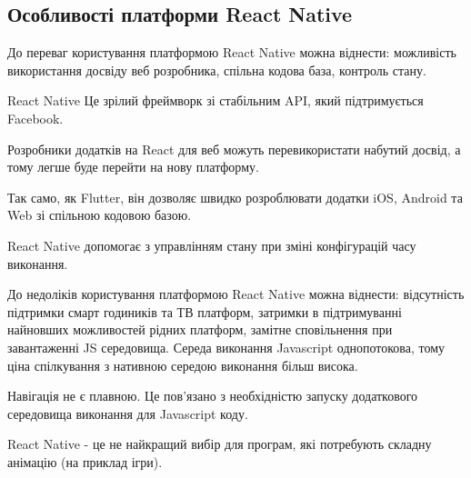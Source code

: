 \subsection{Особливості платформи React Native}
\label{subsec:rn_pros_cons}

До переваг користування платформою React Native можна віднести:
можливість використання досвіду веб розробника,
спільна кодова база,
контроль стану.

React Native Це зрілий фреймворк зі стабільним API, який підтримується Facebook.

Розробники додатків на React для веб можуть перевикористати набутий досвід, а тому легше буде перейти на нову платформу.

Так само, як Flutter, він дозволяє швидко розроблювати додатки iOS, Android та Web зі спільною кодовою базою.

React Native допомогає з управлінням стану при зміні конфігурацій часу виконання.

До недоліків користування платформою React Native можна віднести:
відсутність підтримки смарт годиників та ТВ платформ,
затримки в підтримуванні найновших можливостей рідних платформ,
замітне сповільнення при завантаженні JS середовища.
Середа виконання Javascript однопотокова, тому ціна спілкування з нативною середою
виконання більш висока.

Навігація не є плавною. Це пов'язано з необхідністю запуску додаткового середовища виконання для Javascript коду.

React Native - це не найкращий вибір для програм, які потребують складну анімацію (на приклад ігри).

